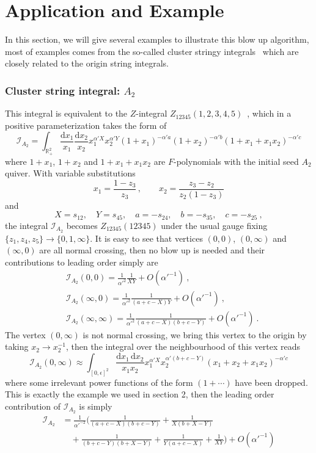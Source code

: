 \documentclass[12pt]{article}
\theoremstyle{definition}
\theoremstyle{plain}
\newcommand{\dif}{\mathrm{d}} %
\begin{document}
\section{Application and Example}

In this section, we will give several examples to illustrate this blow up algorithm, most of examples comes from the so-called cluster stringy integrals~\cite{} which are closely related to the origin string integrals.

\subsubsection*{Cluster string integral: $A_{2}$}
This integral is equivalent to the $Z$-integral $Z_{12345}(1,2,3,4,5)$~\cite{}, which in a positive parameterization takes the form of 
\[
	\mathcal{I}_{A_{2}}=\int_{\mathbb R_+^2} \frac{\dif x_1}{x_1}\frac{\dif x_2}{x_2}x_1^{\alpha' X}x_2^{\alpha' Y}
	(1+x_1)^{-\alpha' a}(1+x_2)^{-\alpha' b}(1+x_1+x_1x_2)^{-\alpha' c}
\] 
where $1+x_{1}$, $1+x_{2}$ and $1+x_{1}+x_{1}x_{2}$ are $F$-polynomials with the initial seed $A_{2}$ quiver. With variable substitutions
\[
	x_{1}=\frac{1-z_{3}}{z_{3}}\,,\qquad x_{2}=\frac{z_{3}-z_{2}}{z_{2}(1-z_{3})}
\]
and 
\[
	X=s_{12},\quad Y=s_{45},\quad a=-s_{24},\quad b=-s_{35},\quad c=-s_{25} \:,
	\] 
the integral $\mathcal{I}_{A_{2}}$ becomes $Z_{12345}(12345)$ under the usual gauge fixing $\{z_{1},z_{4},z_{5}\}\to\{0,1,\infty\}$. It is easy to see that vertices $(0,0)$, $(0,\infty)$ and $(\infty,0)$ are all normal crossing, then no blow up is needed and their contributions to leading order simply are
\begin{align*}
	&\mathcal{I}_{A_{2}}(0,0)=\frac{1}{\alpha'^{2}}\frac{1}{XY}+O(\alpha'^{-1}) \:, \\
	&\mathcal{I}_{A_{2}}(\infty,0)=\frac{1}{\alpha'^{2}}\frac{1}{(a+c-X)Y}+O(\alpha'^{-1}) \:, \\
	&\mathcal{I}_{A_{2}}(\infty,\infty)=\frac{1}{\alpha'^{2}}\frac{1}{(a+c-X)(b+c-Y)}+O(\alpha'^{-1}) \:.
\end{align*}
The vertex $(0,\infty)$ is not normal crossing, we bring this vertex to the origin by taking $x_{2}\to x_{2}^{-1}$, then the integral over the neighbourhood of this vertex reads
\[
    \mathcal{I}_{A_{2}}(0,\infty) \approx \int_{[0,\epsilon]^{2}} \frac{\dif x_{1}\,\dif x_{2}}{x_{1} x_{2}} x_{1}^{\alpha'X}x_{2}^{\alpha'(b+c-Y)}(x_{1}+x_{2}+x_{1}x_{2})^{-\alpha'c}
\]
where some irrelevant power functions of the form $(1+\cdots)$ have been dropped. This is exactly the example we used in section 2, then the leading order contribution of $\mathcal{I}_{A_{2}}$ is simply
\begin{align*}
   \mathcal{I}_{A_2}&=\frac{1}{\alpha'^{-2}}\biggl(\frac{1}{(a+c-X) (b+c-Y)}+\frac{1}{X (b+X-Y)} \\
   &\quad +\frac{1}{(b+c-Y) (b+X-Y)}+\frac{1}{Y (a+c-X)}+\frac{1}{X Y}\biggr) + O(\alpha'^{-1}) 
\end{align*}
\end{document}
